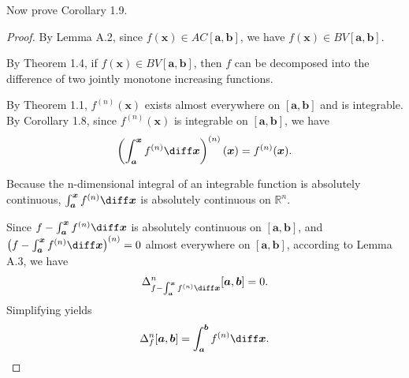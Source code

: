 \documentclass{ijclclp}
\begin{document}
Now prove Corollary 1.9.
\begin{proof}
    By Lemma A.2, since \(f(\boldsymbol{x})\in AC[\boldsymbol{a},\boldsymbol{b}]\), we have \(f(\boldsymbol{x})\in BV[\boldsymbol{a},\boldsymbol{b}]\).
    
    By Theorem 1.4, if \(f(\boldsymbol{x})\in BV[\boldsymbol{a},\boldsymbol{b}]\), then \(f\) can be decomposed into the difference of two jointly monotone increasing functions.
    
    By Theorem 1.1, \(f^{(n)}(\boldsymbol{x})\) exists almost everywhere on \([\boldsymbol{a},\boldsymbol{b}]\) and is integrable.
    By Corollary 1.8, since \(f^{(n)}(\boldsymbol{x})\) is integrable on \([\boldsymbol{a},\boldsymbol{b}]\), we have
    \[\left(\int_{\boldsymbol{a}}^{\boldsymbol{x}} f^{(n)}\diff \boldsymbol{x}\right)^{(n)}(\boldsymbol{x})=f^{(n)}(\boldsymbol{x}).\]
   
    Because the n-dimensional integral of an integrable function is absolutely continuous, \(\int_{\boldsymbol{a}}^{\boldsymbol{x}} f^{(n)}\diff \boldsymbol{x}\) is absolutely continuous on \(\mathbb{R}^n\).
    
    Since \(f-\int_{\boldsymbol{a}}^{\boldsymbol{x}} f^{(n)}\diff \boldsymbol{x}\) is absolutely continuous on \([\boldsymbol{a},\boldsymbol{b}]\), and \(\left(f-\int_{\boldsymbol{a}}^{\boldsymbol{x}} f^{(n)}\diff \boldsymbol{x}\right)^{(n)}=0\) almost everywhere on \([\boldsymbol{a},\boldsymbol{b}]\), according to Lemma A.3, we have
    \[\Delta_{f-\int_{\boldsymbol{a}}^{\boldsymbol{x}} f^{(n)}\diff \boldsymbol{x}}^n[\boldsymbol{a},\boldsymbol{b}]=0.\]
    Simplifying yields
    \[\Delta_f^n[\boldsymbol{a},\boldsymbol{b}]=\int_{\boldsymbol{a}}^{\boldsymbol{b}}f^{(n)}\diff \boldsymbol{x}.\]
\end{proof}
\end{document}
